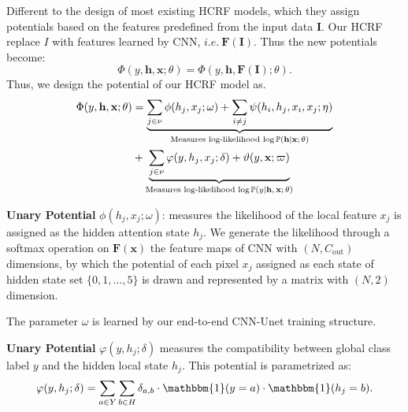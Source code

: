\documentclass[conference]{IEEEtran}
\newcommand{\PP}{{\mathbb P}}
\begin{document}
Different to the design of most existing HCRF models, which they assign potentials based on the features predefined from the input data \(\mathbf{I}\).
Our HCRF replace \(I\) with features learned by CNN, \(i.e. \ \mathbf{F}(\mathbf{I})\). 
Thus the new potentials become:
\[
	\Phi(y, \mathbf{h}, \mathbf{x}; \theta) = \Phi(y, \mathbf{h}, \mathbf{F}(\mathbf{I}); \theta).
\]
Thus, we design the potential of our HCRF model as.
\begin{align}
	\Phi(y, \mathbf{h}, \mathbf{x}; \theta) & = \underbrace{\sum_{j \in \nu} \phi(h_{j}, x_{j}; \omega) +
	\sum_{i \neq j} \psi(h_{i}, h_{j}, x_{i}, x_{j}; \eta) }_{
		\textrm{Measures  log-likelihood \(\log\PP ( \mathbf{h}| \mathbf{x}; \theta)\)}
		}\\
	& + \underbrace{ \sum_{j \in \nu}\varphi
	(y, h_{j}, x_{j}; \delta) + \vartheta(y, \mathbf{x};
	\varpi)}_{
		\textrm{Measures log-likelihood \(\log \PP (y | \mathbf{h},  \mathbf{x}; \theta)\)}
		}
\end{align}

\noindent
{\textbf{Unary Potential}} \(\phi(h_{j}, x_{j}; \omega)\): measures the likelihood of the local feature
\(x_{j}\) is assigned as the hidden attention state \(h_{j}\).
We generate the likelihood through a softmax operation on \(\mathbf{F}(\mathbf{x})\)
the feature maps of CNN with \((N, C_{\textrm{out}})\) dimensions,
by which the potential of each pixel \(x_j\) assigned as each
state of hidden state set \(\{0, 1, \dots, 5\}\)
is drawn and represented by a matrix with \((N, 2)\) dimension.

The parameter \(\omega\) is learned by our end-to-end CNN-Unet training structure.

\noindent
{\textbf{Unary Potential}} \(\varphi(y, h_{j}; \delta)\) measures the compatibility between global class label \(y\)
and the hidden local state \(h_{j}\).
This potential is parametrized as:
\[
	\varphi(y, h_{j};\delta) = \sum_{a \in Y} \sum_{b \in H} \delta_{a, b}
	\cdot \mathbbm{1}(y = a) \cdot \mathbbm{1}(h_{j} = b).
\]
\end{document}

